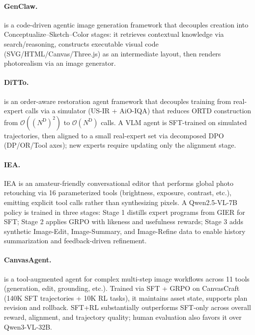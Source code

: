 \paragraph{GenClaw.}
 is a code-driven agentic image generation framework that decouples creation into Conceptualize–Sketch–Color stages: it retrieves contextual knowledge via search/reasoning, constructs executable visual code (SVG/HTML/Canvas/Three.js) as an intermediate layout, then renders photorealism via an image generator. ~\cite{ye2026genclaw}

\paragraph{DiTTo.}
 is an order-aware restoration agent framework that decouples training from real-expert calls via a simulator (US-IR + AiO-IQA) that reduces ORTD construction from $\mathcal{O}((N^{\mathrm{D}})^2)$ to $\mathcal{O}(N^{\mathrm{D}})$ calls. A VLM agent is SFT-trained on simulated trajectories, then aligned to a small real-expert set via decomposed DPO (DP/OR/Tool axes); new experts require updating only the alignment stage.~\cite{avg260530915}

\paragraph{IEA.}
IEA is an amateur-friendly conversational editor that performs global photo retouching via 16 parameterized tools (brightness, exposure, contrast, etc.), emitting explicit tool calls rather than synthesizing pixels. A Qwen2.5-VL-7B policy is trained in three stages: Stage 1 distills expert programs from GIER for SFT; Stage 2 applies GRPO with likeness and usefulness rewards; Stage 3 adds synthetic Image-Edit, Image-Summary, and Image-Refine data to enable history summarization and feedback-driven refinement. ~\cite{avg260608016}

\paragraph{CanvasAgent.}
 is a tool-augmented agent for complex multi-step image workflows across 11 tools (generation, edit, grounding, etc.). Trained via SFT + GRPO on CanvasCraft (140K SFT trajectories + 10K RL tasks), it maintains asset state, supports plan revision and rollback. SFT+RL substantially outperforms SFT-only across overall reward, alignment, and trajectory quality; human evaluation also favors it over Qwen3-VL-32B.~\cite{avg260705465}


